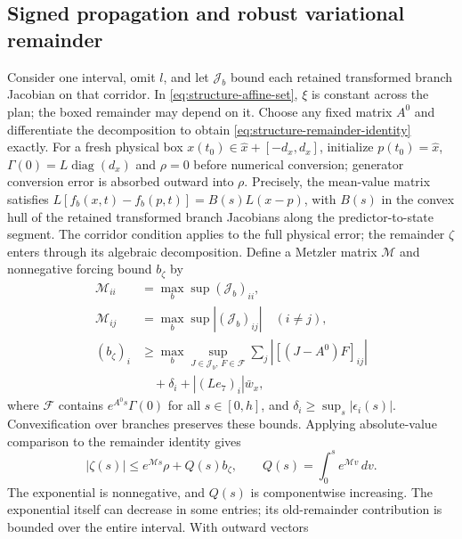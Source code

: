 \subsection{Signed propagation and robust variational remainder}

Consider one interval, omit $l$, and let $\mathcal J_b$ bound each retained
transformed branch Jacobian on that corridor. In
\eqref{eq:structure-affine-set}, $\xi$ is constant across the plan;
the boxed remainder may depend on it. Choose any fixed matrix $A^0$ and
differentiate the decomposition to obtain
\eqref{eq:structure-remainder-identity} exactly. For a fresh physical box
$x(t_0)\in\widehat x+[-d_x,d_x]$, initialize $p(t_0)=\widehat x$,
$\Gamma(0)=L\operatorname{diag}(d_x)$ and $\rho=0$ before numerical
conversion; generator conversion error is absorbed outward into $\rho$.
Precisely, the mean-value matrix satisfies
$L[f_b(x,t)-f_b(p,t)]=B(s)L(x-p)$, with $B(s)$ in the convex hull of
the retained transformed branch Jacobians along the predictor-to-state
segment. The corridor condition applies to the full physical error; the
remainder $\zeta$ enters through its algebraic decomposition.
Define a Metzler matrix
$\mathcal M$ and nonnegative forcing bound $b_\zeta$ by
\begin{equation}
 \begin{aligned}
 \mathcal M_{ii}&=\max_b\sup(\mathcal J_b)_{ii},\\
 \mathcal M_{ij}&=\max_b\sup|(\mathcal J_b)_{ij}|\quad(i\ne j),\\
 (b_\zeta)_i&\ge\max_b\sup_{J\in\mathcal J_b,\,F\in\mathcal F}
                  \sum_j|[(J-A^0)F]_{ij}|\\
             &\hspace{1em}+\delta_i+|(Le_7)_i|\bar w_x,
 \end{aligned}
 \label{eq:structure-metzler}
\end{equation}
where $\mathcal F$ contains $e^{A^0s}\Gamma(0)$ for all $s\in[0,h]$,
and $\delta_i\ge\sup_s|\epsilon_i(s)|$. Convexification over branches
preserves these bounds. Applying absolute-value comparison to the remainder
identity gives
\begin{equation}
 |\zeta(s)|\le e^{\mathcal Ms}\rho+Q(s)b_\zeta,
 \qquad Q(s)=\int_0^s e^{\mathcal Mv}\,dv.
 \label{eq:structure-remainder-bound}
\end{equation}
The exponential is nonnegative, and $Q(s)$ is componentwise increasing.
The exponential itself can decrease in some entries; its old-remainder
contribution is bounded over the entire interval. With outward vectors
